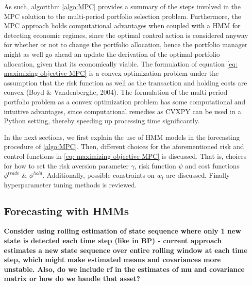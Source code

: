 As such, algorithm \ref{algo:MPC} provides a summary of the steps involved in the MPC solution to the multi-period portfolio selection problem. Furthermore, the MPC approach holds computational advantages when coupled with a HMM for detecting economic regimes, since the optimal control action is considered anyway for whether or not to change the portfolio allocation, hence the portfolio manager might as well go ahead an update the derivation of the optimal portfolio allocation, given that its economically viable. The formulation of equation \ref{eq: maximizing objective MPC} is a convex optimization problem under the assumption that the risk function as well as the transaction and holding costs are convex (Boyd \& Vandenberghe, 2004). The formulation of the multi-period portfolio problem as a convex optimization problem has some computational and intuitive advantages, since computational remedies as CVXPY can be used in a Python setting, thereby speeding up processing time significantly.

In the next sections, we first explain the use of HMM models in the forecasting procedure of \cref{algo:MPC}. Then, different choices for the aforementioned risk and control functions in \cref{eq: maximizing objective MPC} is discussed. That is, choices for how to set the risk aversion parameter $\gamma$, risk function $\psi$ and cost functions $\phi^{trade}$ \& $\phi^{hold}$. Additionally, possible constraints on $w_t$ are discussed. Finally hyperparameter tuning methods is reviewed.

\subsection{Forecasting with HMMs}
\label{section: forecasting MPC HMM}

\textbf{Consider using rolling estimation of state sequence where only 1 new state is detected each time step (like in BP) - current approach estimates a new state sequence over entire rolling window at each time step, which might make estimated means and covariances more unstable. Also, do we include rf in the estimates of mu and covariance matrix or how do we handle that asset?}

